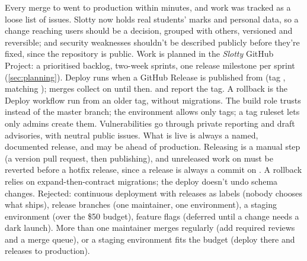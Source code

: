   {Every merge to  went to production within minutes, and work was tracked as a
   loose list of issues. Slotty now holds real students' marks and personal data, so a change
   reaching users should be a decision, grouped with others, versioned and reversible; and
   security weaknesses shouldn't be described publicly before they're fixed, since the
   repository is public.}
  {Work is planned in the \emph{Slotty} GitHub Project: a prioritised backlog, two-week sprints,
   one release milestone per sprint (\cref{sec:planning}). Deploy runs when a GitHub Release is
   published from  (tag , matching ); merges collect
   on  until then.  and  report the tag. A rollback
   is the Deploy workflow run from an older tag, without migrations. The build role trusts
    instead of the master branch; the  environment
   allows only  tags; a tag ruleset lets only admins create them. Vulnerabilities go
   through private reporting and draft advisories, with neutral public issues.}
  {What is live is always a named, documented release, and  may be ahead of
   production. Releasing is a manual step (a version pull request, then publishing), and
   unreleased work on  must be reverted before a hotfix release, since a release is
   always a commit on . A rollback relies on expand-then-contract migrations; the
   deploy doesn't undo schema changes. Rejected: continuous deployment with releases as labels
   (nobody chooses what ships), release branches (one maintainer, one environment), a staging
   environment (over the \$50 budget), feature flags (deferred until a change needs a dark
   launch).}
  {More than one maintainer merges regularly (add required reviews and a merge queue), or a
   staging environment fits the budget (deploy  there and releases to production).}

